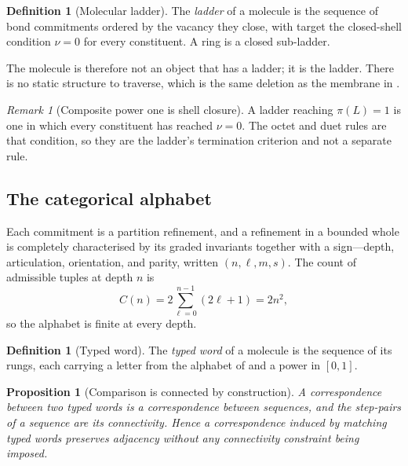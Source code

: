 \documentclass[11pt,a4paper]{article}
\theoremstyle{clthm}
\newtheorem{proposition}[theorem]{Proposition}
\theoremstyle{definition}
\newtheorem{definition}[theorem]{Definition}
\theoremstyle{remark}
\newtheorem{remark}[theorem]{Remark}
\newcommand{\pow}{\pi}
\newcommand{\Lad}{L}
\begin{document}
\begin{definition}[Molecular ladder]
\label{def:mollad}
The \emph{ladder} of a molecule is the sequence of bond commitments
ordered by the vacancy they close, with target the closed-shell condition
$\nu=0$ for every constituent. A ring is a closed sub-ladder.
\end{definition}

The molecule is therefore not an object that has a ladder; it is the
ladder. There is no static structure to traverse, which is the same
deletion as the membrane in .

\begin{remark}[Composite power one is shell closure]
\label{rem:closure}
A ladder reaching $\pow(\Lad)=1$ is one in which every constituent has
reached $\nu=0$. The octet and duet rules are that condition, so they are
the ladder's termination criterion and not a separate rule.
\end{remark}

\subsection{The categorical alphabet}

Each commitment is a partition refinement, and a refinement in a bounded
whole is completely characterised by its graded invariants together with a
sign---depth, articulation, orientation, and parity, written
$(n,\ell,m,s)$. The count of admissible tuples at depth $n$ is
\begin{equation}
C(n)=2\sum_{\ell=0}^{n-1}(2\ell+1)=2n^{2},
\label{eq:capacity}
\end{equation}
so the alphabet is finite at every depth.

\begin{definition}[Typed word]
\label{def:word}
The \emph{typed word} of a molecule is the sequence of its rungs, each
carrying a letter from the alphabet of  and a power in
$[0,1]$.
\end{definition}

\begin{proposition}[Comparison is connected by construction]
\label{prop:connected}
A correspondence between two typed words is a correspondence between
sequences, and the step-pairs of a sequence are its connectivity. Hence a
correspondence induced by matching typed words preserves adjacency without
any connectivity constraint being imposed.
\end{proposition}
\end{document}
